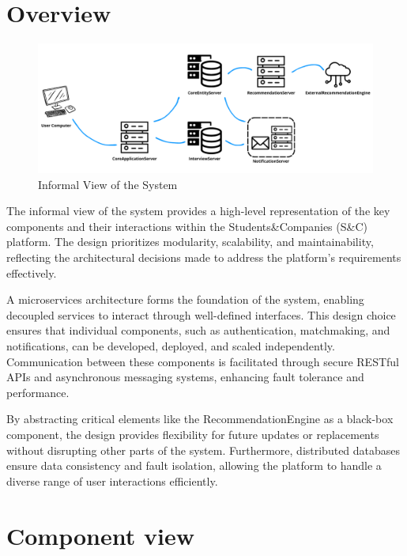 \section{Overview} 

\begin{figure}[H]
    \centering
    \includegraphics[width=\textwidth]{Images/informal-view.png}
    \caption{Informal View of the System}
    \label{fig:informal_view}
\end{figure}

The informal view of the system provides a high-level representation of the key components and their interactions within the Students\&Companies (S\&C) platform. The design prioritizes modularity, scalability, and maintainability, reflecting the architectural decisions made to address the platform's requirements effectively.

A microservices architecture forms the foundation of the system, enabling decoupled services to interact through well-defined interfaces. This design choice ensures that individual components, such as authentication, matchmaking, and notifications, can be developed, deployed, and scaled independently. Communication between these components is facilitated through secure RESTful APIs and asynchronous messaging systems, enhancing fault tolerance and performance.

By abstracting critical elements like the RecommendationEngine as a black-box component, the design provides flexibility for future updates or replacements without disrupting other parts of the system. Furthermore, distributed databases ensure data consistency and fault isolation, allowing the platform to handle a diverse range of user interactions efficiently.


\section{Component view}

